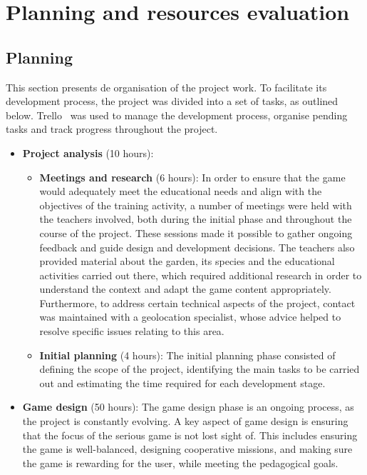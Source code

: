 \chapter{Planning and resources evaluation}


\section{Planning}
This section presents de organisation of the project work. To facilitate its development process, the project was divided into a set of tasks, as outlined below. Trello~\cite{trello} was used to manage the development process, organise pending tasks and track progress throughout the project.

\begin{itemize}
    \item \textbf{Project analysis} (10 hours):
    \begin{itemize}
        \item \textbf{Meetings and research} (6 hours): In order to ensure that the game would adequately meet the educational needs and align with the objectives of the training activity, a number of meetings were held with the teachers involved, both during the initial phase and throughout the course of the project. These sessions made it possible to gather ongoing feedback and guide design and development decisions. The teachers also provided material about the garden, its species and the educational activities carried out there, which required additional research in order to understand the context and adapt the game content appropriately. Furthermore, to address certain technical aspects of the project, contact was maintained with a geolocation specialist, whose advice helped to resolve specific issues relating to this area.  
        \item \textbf{Initial planning} (4 hours): The initial planning phase consisted of defining the scope of the project, identifying the main tasks to be carried out and estimating the time required for each development stage.
    \end{itemize}

    \item \textbf{Game design} (50 hours): The game design phase is an ongoing process, as the project is constantly evolving. A key aspect of game design is ensuring that the focus of the serious game is not lost sight of. This includes ensuring the game is well-balanced, designing cooperative missions, and making sure the game is rewarding for the user, while meeting the pedagogical goals.
    

\end{itemize}
